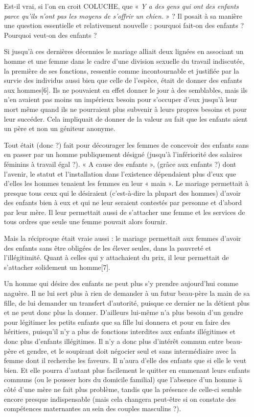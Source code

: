 Est-il vrai, si l'on en croit COLUCHE, que « \emph{Y a des gens qui ont des enfants parce qu'ils n'ont pas les moyens de s'offrir un chien.} » ? Il posait à sa manière une question essentielle et relativement nouvelle : pourquoi fait-on des enfants ? Pourquoi veut-on des enfants ?

 Si jusqu'à ces dernières décennies le mariage alliait deux lignées en associant un homme et une femme dans le cadre d'une division sexuelle du travail indiscutée, la première de ses fonctions, ressentie comme incontournable et justifiée par la survie des individus aussi bien que celle de l'espèce, était de donner des enfants aux hommes[6]. Ils ne pouvaient en effet donner le jour à des semblables, mais ils n'en avaient pas moins un impérieux besoin pour s'occuper d'eux jusqu'à leur mort même quand ils ne pourraient plus subvenir à leurs propres besoins et pour leur succéder. Cela impliquait de donner de la valeur au fait que les enfants aient un père et non un géniteur anonyme. 
 
 Tout était (donc ?) fait pour décourager les femmes de concevoir des enfants sans en passer par un homme publiquement désigné (jusqu'à l'infériorité des salaires féminins à travail égal ?). « A cause des enfants », (grâce aux enfants ?) dont l'avenir, le statut et l'installation dans l'existence dépendaient plus d'eux que d'elles les hommes tenaient les femmes en leur « main ». Le mariage permettait à presque tous ceux qui le désiraient (c'est-à-dire la plupart des hommes) d'avoir des enfants bien à eux et qui ne leur seraient contestés par personne et d'abord par leur mère. Il leur permettait aussi de s'attacher une femme et les services de tous ordres que seule une femme pouvait alors fournir. 
 
 Mais la réciproque était vraie aussi : le mariage permettait aux femmes d'avoir des enfants sans être obligées de les élever seules, dans la pauvreté et l'illégitimité. Quant à celles qui y attachaient du prix, il leur permettait de s'attacher solidement un homme[7]. 
 
 Un homme qui désire des enfants ne peut plus s'y prendre aujourd'hui comme naguère. Il ne lui sert plus à rien de demander à un futur beau-père la main de sa fille, de lui demander un transfert d'autorité, puisque ce dernier ne la détient plus et ne peut donc plus la donner. D'ailleurs lui-même n'a plus besoin d'un gendre pour légitimer les petits enfants que sa fille lui donnera et pour en faire des héritiers, puisqu'il n'y a plus de fonctions interdites aux enfants illégitimes et donc plus d'enfants illégitimes. Il n'y a donc plus d'intérêt commun entre beau-père et gendre, et le soupirant doit négocier seul et sans intermédiaire avec la femme dont il recherche les faveurs. Il n'aura d'elle des enfants que si elle le veut bien. Et elle pourra d'autant plus facilement le quitter en emmenant leurs enfants communs (ou le pousser hors du domicile familial) que l'absence d'un homme à côté d'une mère ne fait plus problème, tandis que la présence de celle-ci semble encore presque indispensable (mais cela changera peut-être si on constate des compétences maternantes au sein des couples masculins ?). 
 
